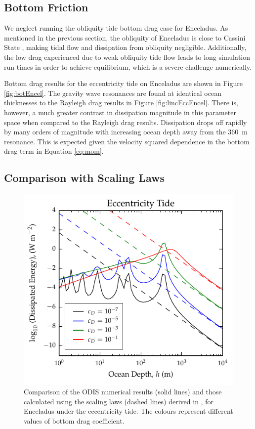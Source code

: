 \subsection{Bottom Friction}

We neglect running the obliquity tide bottom drag case for Enceladus. As mentioned in the previous section, the obliquity of Enceladus is close to Cassini State \citep{chen2011obliquity,chen2013tidal}, making tidal flow and dissipation from obliquity negligible. Additionally, the low drag experienced due to weak obliquity tide flow leads to long simulation run times in order to achieve equilibrium, which is a severe challenge numerically.

Bottom drag results for the eccentricity tide on Enceladus are shown in Figure \ref{fig:botEncel}. The gravity wave resonances are found at identical ocean thicknesses to the Rayleigh drag results in Figure \ref{fig:lincEccEncel}. There is, however, a much greater contrast in dissipation magnitude in this parameter space when compared to the Rayleigh drag results. Dissipation drops off rapidly by many orders of magnitude with increasing ocean depth away from the \SI{360}{\metre} resonance. This is expected given the velocity squared dependence in the bottom drag term in Equation \ref{eq:mom}. 

\subsection{Comparison with Scaling Laws}

\begin{figure}[!b]
\centering
\includegraphics[width=0.85\linewidth]{Figures/enceladus_scaling}
\caption{Comparison of the ODIS numerical results (solid lines) and those calculated using the scaling laws (dashed lines) derived in \citet{chen2013tidal}, for Enceladus under the eccentricity tide. The colours represent different values of bottom drag coefficient. \label{fig:scalEncel}}
\end{figure}

